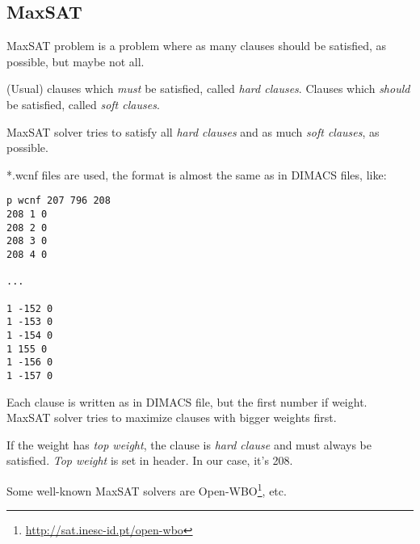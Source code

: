 \subsection{MaxSAT}

MaxSAT problem is a problem where as many clauses should be satisfied, as possible, but maybe not all.

(Usual) clauses which \emph{must} be satisfied, called \emph{hard clauses}.
Clauses which \emph{should} be satisfied, called \emph{soft clauses}.

MaxSAT solver tries to satisfy all \emph{hard clauses} and as much \emph{soft clauses}, as possible.

*.wcnf files are used, the format is almost the same as in DIMACS files, like:

\begin{lstlisting}
p wcnf 207 796 208
208 1 0
208 2 0
208 3 0
208 4 0

...

1 -152 0
1 -153 0
1 -154 0
1 155 0
1 -156 0
1 -157 0
\end{lstlisting}

Each clause is written as in DIMACS file, but the first number if weight.
MaxSAT solver tries to maximize clauses with bigger weights first.

If the weight has \emph{top weight}, the clause is \emph{hard clause} and must always be satisfied.
\emph{Top weight} is set in header.
In our case, it's 208.

Some well-known MaxSAT solvers are Open-WBO\footnote{\url{http://sat.inesc-id.pt/open-wbo}}, etc.

